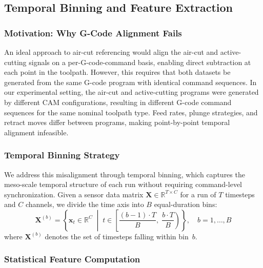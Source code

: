 \subsection{Temporal Binning and Feature Extraction}\label{sec:temporal_binning}

\subsubsection{Motivation: Why G-Code Alignment Fails}

An ideal approach to air-cut referencing would align the air-cut and active-cutting signals on a per-G-code-command basis, enabling direct subtraction at each point in the toolpath. However, this requires that both datasets be generated from the same G-code program with identical command sequences. In our experimental setting, the air-cut and active-cutting programs were generated by different CAM configurations, resulting in different G-code command sequences for the same nominal toolpath type. Feed rates, plunge strategies, and retract moves differ between programs, making point-by-point temporal alignment infeasible.

\subsubsection{Temporal Binning Strategy}

We address this misalignment through temporal binning, which captures the meso-scale temporal structure of each run without requiring command-level synchronization. Given a sensor data matrix $\mathbf{X} \in \mathbb{R}^{T \times C}$ for a run of $T$ timesteps and $C$ channels, we divide the time axis into $B$ equal-duration bins:
\begin{equation}
    \mathbf{X}^{(b)} = \left\{ \mathbf{x}_t \in \mathbb{R}^C \;\middle|\; t \in \left[\frac{(b-1) \cdot T}{B},\; \frac{b \cdot T}{B}\right) \right\}, \quad b = 1, \ldots, B
\end{equation}
where $\mathbf{X}^{(b)}$ denotes the set of timesteps falling within bin~$b$.

\subsubsection{Statistical Feature Computation}

